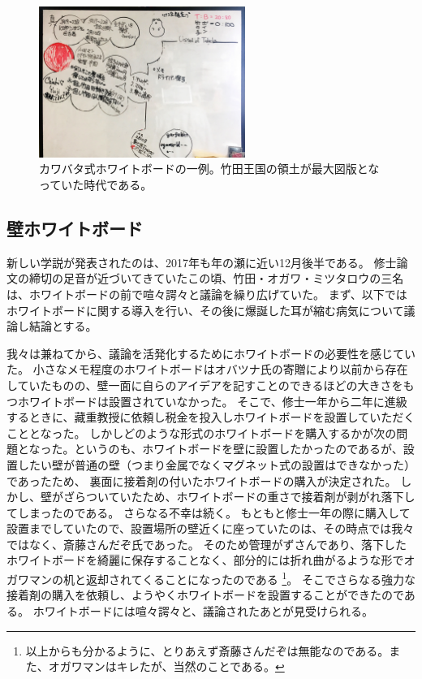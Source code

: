 \begin{figure}
  \begin{center}
  \includegraphics[width=0.6\textwidth]{./section/Mimi/figures/KawabataWhiteBoard.jpg}
    \caption{カワバタ式ホワイトボードの一例。竹田王国の領土が最大図版となっていた時代である。}
  \label{fig:KawabataWhiteBoard}
  \end{center}
\end{figure}

\subsection{壁ホワイトボード}
新しい学説が発表されたのは、2017年も年の瀬に近い12月後半である。
修士論文の締切の足音が近づいてきていたこの頃、竹田・オガワ・ミツタロウの三名は、ホワイトボードの前で喧々諤々と議論を繰り広げていた。
まず、以下ではホワイトボードに関する導入を行い、その後に爆誕した耳が縮む病気について議論し結論とする。
\par
我々は兼ねてから、議論を活発化するためにホワイトボードの必要性を感じていた。
小さなメモ程度のホワイトボードはオバツナ氏の寄贈により以前から存在していたものの、壁一面に自らのアイデアを記すことのできるほどの大きさをもつホワイトボードは設置されていなかった。
そこで、修士一年から二年に進級するときに、藏重教授に依頼し税金を投入しホワイトボードを設置していただくこととなった。
しかしどのような形式のホワイトボードを購入するかが次の問題となった。というのも、ホワイトボードを壁に設置したかったのであるが、設置したい壁が普通の壁（つまり金属でなくマグネット式の設置はできなかった）であったため、
裏面に接着剤の付いたホワイトボードの購入が決定された。
しかし、壁がざらついていたため、ホワイトボードの重さで接着剤が剥がれ落下してしまったのである。
さらなる不幸は続く。
もともと修士一年の際に購入して設置までしていたので、設置場所の壁近くに座っていたのは、その時点では我々ではなく、斎藤さんだぞ氏であった。
そのため管理がずさんであり、落下したホワイトボードを綺麗に保存することなく、部分的には折れ曲がるような形でオガワマンの机と返却されてくることになったのである
\footnote{以上からも分かるように、とりあえず斎藤さんだぞは無能なのである。また、オガワマンはキレたが、当然のことである。}。
そこでさらなる強力な接着剤の購入を依頼し、ようやくホワイトボードを設置することができたのである。
ホワイトボードには喧々諤々と、議論されたあとが見受けられる。

